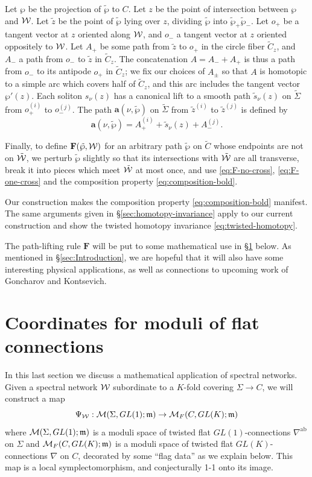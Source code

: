\documentclass[11pt,a4paper]{article}
\def\twp{\tilde\wp}
\def\CM {{\cal M}}
\def\wnet {{\cal W}}
\def\ab{{\mathrm{ab}}}
\def\tz{{\tilde z}}
\def\ba{\mathbf{a}}
\def\bF{\mathbf{F}}
\def\fm{\mathfrak{m}}
\def\CM {{\cal M}}
\def\wnet {{\cal W}}
\begin{document}
Let $\wp$ be the projection of $\twp$ to $C$.  Let $z$ be the point of intersection between $\wp$ and $\wnet$.
Let $\tz$ be the point of $\twp$ lying over $z$, dividing $\twp$
into $\twp_+ \twp_-$.
Let $o_+$ be a tangent vector at $z$ oriented along $\wnet$,
and $o_-$ a tangent vector at $z$ oriented oppositely to $\wnet$.
Let $A_+$ be some
path from $\tz$ to $o_+$ in the circle fiber $\tilde C_z$,
and $A_-$ a path from $o_-$ to $\tz$ in $\tilde C_z$.  The
concatenation $A = A_- + A_+$ is thus a path from $o_-$ to its antipode
$o_+$ in $\tilde C_z$;
we fix our choices of $A_\pm$ so that $A$ is homotopic to
a simple arc which covers half of $\tilde C_z$, and this arc includes
the tangent vector $\wp'(z)$.
Each soliton $s_\nu(z)$ has a canonical lift to a smooth path
$\tilde s_\nu(z)$ on $\tilde \Sigma$ from $o_+^{(i)}$ to $o_-^{(j)}$.
The path $\ba(\nu,\twp)$ on $\tilde \Sigma$ from $\tz^{(i)}$ to $\tz^{(j)}$ is defined by
\begin{equation}
 \ba(\nu,\twp) = A^{(i)}_+ + \tilde s_\nu(z) + A^{(j)}_-.
\end{equation}

Finally, to define $\bF(\twp, \wnet)$ for an arbitrary path $\twp$ on $\tilde C$ whose endpoints are
not on $\tilde\wnet$, we perturb $\twp$ slightly
so that its intersections with $\tilde \wnet$ are all transverse, break it into
pieces which meet $\tilde \wnet$ at most once, and use \eqref{eq:F-no-cross},
\eqref{eq:F-one-cross} and the composition property
\eqref{eq:composition-bold}.

Our construction makes the composition property \eqref{eq:composition-bold} manifest.
The same arguments given in \S\ref{sec:homotopy-invariance} apply
to our current construction and show the twisted homotopy invariance
\eqref{eq:twisted-homotopy}.

The path-lifting rule $\bF$ will be put to some mathematical use in
\S \ref{sec:moduli} below.
As mentioned in \S \ref{sec:Introduction}, we are hopeful that it will also have
some interesting physical applications, as well as connections to
upcoming work of Goncharov and Kontsevich.


\section{Coordinates for moduli of flat connections}\label{sec:moduli}

In this last section we discuss a mathematical application of spectral networks.
Given a spectral network $\wnet$ subordinate to a $K$-fold covering $\Sigma \to C$, we will construct
a map
\begin{equation}
 \Psi_\wnet: \CM(\Sigma, GL(1); \fm) \to \CM_F(C, GL(K); \fm)
\end{equation}
where $\CM(\Sigma, GL(1); \fm)$ is a moduli space of twisted flat $GL(1)$-connections $\nabla^\ab$ on $\Sigma$
and $\CM_F(C, GL(K); \fm)$ is a moduli space of twisted flat $GL(K)$-connections $\nabla$ on $C$, decorated
by some ``flag data'' as we explain below.
This map is a local symplectomorphism, and conjecturally 1-1 onto its image.
\end{document}

